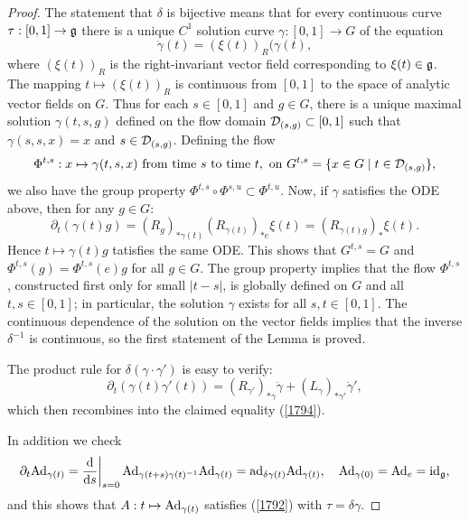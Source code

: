 \begin{proof}
    The statement that $\delta$ is bijective means that for every continuous curve $\tau:[0,1]\to\mathfrak{g}$ there is a unique $C^1$ solution curve $\gamma:[0,1]\to G$ of the equation
    \[\dot\gamma(t)=(\xi(t))_R(\gamma(t),\]
    where $(\xi(t))_R$ is the right-invariant vector field corresponding to $\xi(t)\in\mathfrak{g}$. The mapping $t\mapsto (\xi(t))_R$ is continuous from $[0,1]$ to the space of analytic vector fields on $G$. Thus for each $s\in[0,1]$ and $g\in G$, there is a unique maximal solution $\gamma(t,s,g)$ defined on the flow domain $\mathcal{D}_{(s,g)}\subset [0,1]$ such that $\gamma(s,s,x)=x$ and $s\in \mathcal{D}_{(s,g)}$. Defining the flow
    \[\Phi^{t,s}:x\mapsto \gamma(t,s,x)\text{ from time }s\text{ to time }t,\text{ on }G^{t,s}=\{x\in G\mid t\in \mathcal{D}_{(s,g)}\},\]
    we also have the group property $\Phi^{t,s}\circ \Phi^{s,u}\subset \Phi^{t,u}$. Now, if $\gamma$ satisfies the ODE above, then for any $g\in G$:
    \[\partial_t(\gamma(t)g)=\left(R_{g}\right)_{\ast \gamma(t)} \left(R_{\gamma(t)}\right)_{\ast e}\xi(t)=\left(R_{\gamma(t)g}\right)_{\ast}\xi(t).\]
    Hence $t\mapsto \gamma(t)g$ tatisfies the same ODE. This shows that $G^{t,s}=G$ and $\Phi^{t,s}(g)=\Phi^{t,s}(e)g$ for all $g\in G$. The group property implies that the flow $\Phi^{t,s}$, constructed first only for small $|t-s|$, is globally defined on $G$ and all $t,s\in[0,1]$; in particular, the solution $\gamma$ exists for all $s,t\in [0,1]$. The continuous dependence of the solution on the vector fields implies that the inverse $\delta^{-1}$ is continuous, so the first statement of the Lemma is proved.

    The product rule for $\delta(\gamma\cdot\gamma')$ is easy to verify:
    \[\partial_t(\gamma(t)\gamma'(t))=\left(R_{\gamma'}\right)_{\ast \gamma}\dot\gamma+ \left(L_{\gamma}\right)_{\ast \gamma'}\dot\gamma',\]
    which then recombines into the claimed equality (\ref{1794}).

    In addition we check 
    \[\partial_t \Ad_{\gamma(t)}=\restr{\frac{\dd}{\dd s}}{s=0}\Ad_{\gamma(t+s)\gamma(t)^{-1}}\Ad_{\gamma(t)}=\ad_{\delta \gamma(t)}\Ad_{\gamma(t)},\quad \Ad_{\gamma(0)}=\Ad_e=\id_\frakg,\]
    and this shows that $A:t\mapsto \mathrm{Ad}_{\gamma(t)}$ satisfies (\ref{1792}) with $\tau=\delta\gamma$.


\end{proof}
